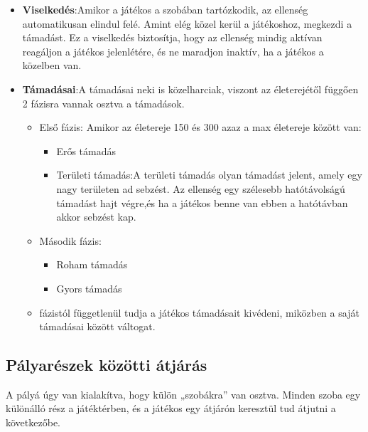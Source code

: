 \documentclass[
]{thesis-ekf}
\theoremstyle{definition}
\theoremstyle{remark}
\begin{document}
\begin{itemize}
\begin{itemize}
		\item \textbf{Viselkedés}:Amikor a játékos a szobában tartózkodik, az ellenség automatikusan elindul felé. Amint elég közel kerül a játékoshoz, megkezdi a támadást. Ez a viselkedés biztosítja, hogy az ellenség mindig aktívan reagáljon a játékos jelenlétére, és ne maradjon inaktív, ha a játékos a közelben van.
		\item \textbf{Támadásai}:A támadásai neki is közelharciak, viszont az életerejétől függően 2 fázisra vannak osztva a támadások.
		\begin{itemize}
			\item Első fázis: Amikor az életereje 150 és 300 azaz a max életereje között van:
			\begin{itemize}
				\item Erős támadás
				\item Területi támadás:A területi támadás olyan támadást jelent, amely egy nagy területen ad sebzést. Az ellenség egy szélesebb hatótávolságú támadást hajt végre,és ha a játékos benne van ebben a hatótávban akkor sebzést kap.
			\end{itemize}
			\item Második fázis:
			\begin{itemize}
				\item Roham támadás
				\item Gyors támadás
			\end{itemize}
			\item fázistól függetlenül tudja a játékos támadásait kivédeni, miközben a saját támadásai között váltogat.
		\end{itemize}
	\end{itemize}
\end{itemize}

\subsection{Pályarészek közötti átjárás}
A pályá úgy van kialakítva, hogy külön „szobákra” van osztva. Minden szoba egy különálló rész a játéktérben, és a játékos egy átjárón keresztül tud átjutni a következőbe.
\end{document}

